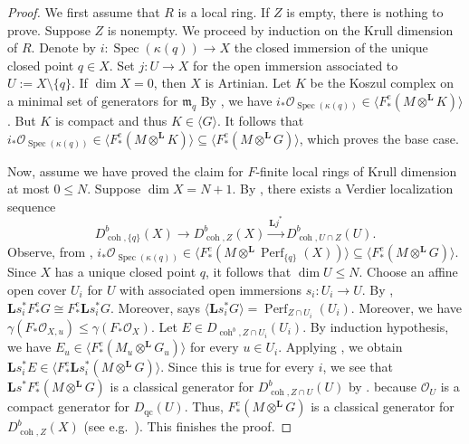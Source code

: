 \documentclass[11pt]{amsart}
\theoremstyle{plain}
\theoremstyle{definition}
\numberwithin{equation}{section}
\numberwithin{theorem}{section}
\begin{document}
\begin{proof}
    We first assume that $R$ is a local ring. 
    If $Z$ is empty, there is nothing to prove.
    Suppose $Z$ is nonempty.
    We proceed by induction on the Krull dimension of $R$. 
    Denote by $i\colon \operatorname{Spec}(\kappa(q))\to X$ the closed immersion of the unique closed point $q\in X$. 
    Set $j\colon U \to X$ for the open immersion associated to $U:=X\setminus \{q\}$. 
    If $\dim X = 0$, then $X$ is Artinian. 
    Let $K$ be the Koszul complex on a minimal set of generators for $\mathfrak{m}_q$
    By , we have $i_\ast \mathcal{O}_{\operatorname{Spec}(\kappa(q))} \in \langle F_\ast^e (M\otimes^\mathbf{L} K) \rangle$.
    But $K$ is compact and thus $K\in\langle G\rangle$. It follows that $i_\ast \mathcal{O}_{\operatorname{Spec}(\kappa(q))} \in \langle F_\ast^e (M\otimes^\mathbf{L} K)\rangle\subseteq\langle F_\ast^e (M\otimes^\mathbf{L} G)\rangle$, which proves the base case. 

    Now, assume we have proved the claim for $F$-finite local rings of Krull dimension at most $0 \leq N$. 
    Suppose $\dim X = N +1$. 
    By , there exists a Verdier localization sequence
    \begin{displaymath}
        D^b_{\operatorname{coh},\{q\}} (X) \to D^b_{\operatorname{coh},Z}(X) \xrightarrow{\mathbf{L}j^\ast} D^b_{\operatorname{coh},U\cap Z}(U).
    \end{displaymath}
    Observe, from , $i_\ast \mathcal{O}_{\operatorname{Spec}(\kappa(q))} \in \langle F^e_\ast (M\otimes^\mathbf{L}\operatorname{Perf}_{\{q\}} (X)) \rangle\subseteq\langle F_\ast^e (M\otimes^\mathbf{L}G)\rangle$. 
    Since $X$ has a unique closed point $q$, it follows that $\dim U \leq N$. 
    Choose an affine open cover $U_i$ for $U$ with associated open immersions $s_i \colon U_i \to U$. 
    By , $\mathbf{L}s_i^\ast F_\ast^e G \cong F_\ast^e \mathbf{L}s_i^\ast G$. 
    Moreover,  says $\langle \mathbf{L}s_i^\ast G \rangle = \operatorname{Perf}_{Z \cap U_i} (U_i)$. 
    Moreover, we have $\gamma(F_*\mathcal{O}_{X,u})\leq\gamma(F_*\mathcal{O}_X)$. Let $E\in D_{\operatorname{coh}^{b},Z\cap U_i}(U_i)$. By induction hypothesis, we have $E_u\in\langle F_\ast^e (M_u\otimes^\mathbf{L} G_u)\rangle$ for every $u\in U_i$.
    Applying \cite[Theorem 3.6]{Letz:2021}, we obtain $\mathbf{L}s_i^\ast E\in \langle F_\ast^e \mathbf{L}s_i^\ast (M\otimes^\mathbf{L}G) \rangle$. 
    Since this is true for every $i$, we see that $\mathbf{L}s^\ast F_\ast^e (M\otimes^\mathbf{L}G)$ is a classical generator for $D^b_{\operatorname{coh},Z\cap U}(U)$ by . because $\mathcal{O}_U$ is a compact generator for $D_{\operatorname{qc}}(U)$. 
    Thus, $F_\ast^e (M\otimes^\mathbf{L}G)$ is a classical generator for $D^b_{\operatorname{coh},Z}(X)$ (see e.g.\ \cite[Proposition 4.3]{Elagin/Lunts/Schnurer:2020}). 
    This finishes the proof.


\end{proof}
\end{document}
